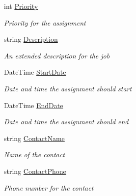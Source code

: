 \begin{DoxyCompactItemize}
int \hyperlink{class_field_service_1_1_data_1_1_assignment_a36ac0add7b96a5f3902a15e8a7131639}{Priority}
\begin{DoxyCompactList}\small\item\em Priority for the assignment \end{DoxyCompactList}\item 
string \hyperlink{class_field_service_1_1_data_1_1_assignment_a8c1fbaa2a0f8a1d736cdccd5671345a2}{Description}
\begin{DoxyCompactList}\small\item\em An extended description for the job \end{DoxyCompactList}\item 
Date\+Time \hyperlink{class_field_service_1_1_data_1_1_assignment_a1760d94888dee49e2e13aac039540d23}{Start\+Date}
\begin{DoxyCompactList}\small\item\em Date and time the assignment should start \end{DoxyCompactList}\item 
Date\+Time \hyperlink{class_field_service_1_1_data_1_1_assignment_a20fd1a8457f8294f8b54a80477efd32b}{End\+Date}
\begin{DoxyCompactList}\small\item\em Date and time the assignment should end \end{DoxyCompactList}\item 
string \hyperlink{class_field_service_1_1_data_1_1_assignment_abb0b1bb567dd689acb86b2d92b45e607}{Contact\+Name}
\begin{DoxyCompactList}\small\item\em Name of the contact \end{DoxyCompactList}\item 
string \hyperlink{class_field_service_1_1_data_1_1_assignment_af35effb86cc44cbea2ede60fd2b879e2}{Contact\+Phone}
\begin{DoxyCompactList}\small\item\em Phone number for the contact \end{DoxyCompactList}\item 

\end{DoxyCompactItemize}
